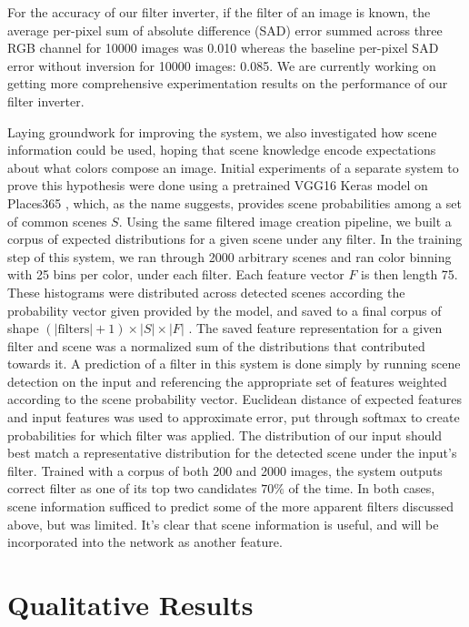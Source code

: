 \documentclass[11pt]{article}
\begin{document}
For the accuracy of our filter inverter, if the filter of an image is known, the average per-pixel sum of absolute difference (SAD) error summed across three RGB channel for 10000 images was 0.010 whereas the baseline per-pixel SAD error without inversion for 10000 images: 0.085. We are currently working on getting more comprehensive experimentation results on the performance of our filter inverter.

Laying groundwork for improving the system, we also investigated how scene information could be used, hoping that scene knowledge encode expectations about what colors compose an image. Initial experiments of a separate system to prove this hypothesis were done using a pretrained VGG16 Keras model on Places365 \cite{Places}, which, as the name suggests, provides scene probabilities among a set of common scenes $S$. Using the same filtered image creation pipeline, we built a corpus of expected distributions for a given scene under any filter. In the training step of this system, we ran through 2000 arbitrary scenes and ran color binning with 25 bins per color, under each filter. Each feature vector $F$ is then length 75. These histograms were distributed across detected scenes according the probability vector given provided by the model, and saved to a final corpus of shape $(|\text{filters}| + 1) \times |S| \times |F|$ . The saved feature representation for a given filter and scene was a normalized sum of the distributions that contributed towards it.
A prediction of a filter in this system is done simply by running scene detection on the input and referencing the appropriate set of features weighted according to the scene probability vector. Euclidean distance of expected features and input features was used to approximate error, put through softmax to create probabilities for which filter was applied. The distribution of our input should best match a representative distribution for the detected scene under the input's filter. Trained with a corpus of both 200 and 2000 images, the system outputs correct filter as one of its top two candidates $70\%$ of the time. In both cases, scene information sufficed to predict some of the more apparent filters discussed above, but was limited. It's clear that scene information is useful, and will be incorporated into the network as another feature.

\section*{Qualitative Results}
\end{document}
